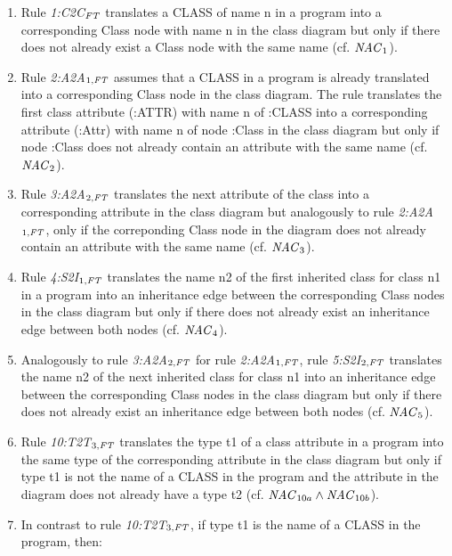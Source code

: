 \begin{example}
\begin{enumerate}
  \item Rule \textit{1:C2C}$_\mathit{FT}$ translates a \textsf{CLASS} of name \textsf{n} in a program into a corresponding \textsf{Class} node with name \textsf{n} in the class diagram but only if there does not already exist a \textsf{Class} node with the same name (cf. $\mathit{NAC}_1$).
  \item Rule \textit{2:A2A}$_{1,\mathit{FT}}$ assumes that a \textsf{CLASS} in a program is already translated into a corresponding \textsf{Class} node in the class diagram.
  The rule translates the first class attribute (\textsf{:ATTR}) with name \textsf{n} of \textsf{:CLASS} into a corresponding attribute (\textsf{:Attr}) with name \textsf{n} of node \textsf{:Class} in the class diagram but only if node \textsf{:Class} does not already contain an attribute with the same name (cf. $\mathit{NAC}_2$).
  \item Rule \textit{3:A2A}$_{2,\mathit{FT}}$ translates the next attribute of the class into a corresponding attribute in the class diagram but analogously to rule \textit{2:A2A}$_{1,\mathit{FT}}$, only if the correponding \textsf{Class} node in the diagram does not already contain an attribute with the same name (cf. $\mathit{NAC}_3$).
  \item Rule \textit{4:S2I}$_{1,\mathit{FT}}$ translates the name \textsf{n2} of the first inherited class for class \textsf{n1} in a program into an inheritance edge between the corresponding \textsf{Class} nodes in the class diagram but only if there does not already exist an inheritance edge between both nodes (cf. $\mathit{NAC}_4$).
  \item Analogously to rule \textit{3:A2A}$_{2,\mathit{FT}}$ for rule \textit{2:A2A}$_{1,\mathit{FT}}$, rule \textit{5:S2I}$_{2,\mathit{FT}}$ translates the name \textsf{n2} of the next inherited class for class \textsf{n1} into an inheritance edge between the corresponding \textsf{Class} nodes in the class diagram but only if there does not already exist an inheritance edge between both nodes (cf. $\mathit{NAC}_5$).
  \item Rule \textit{10:T2T}$_{3,\mathit{FT}}$ translates the type \textsf{t1} of a class attribute in a program into the same type of the corresponding attribute in the class diagram but only if type \textsf{t1} is not the name of a \textsf{CLASS} in the program and the attribute in the diagram does not already have a type \textsf{t2} (cf. $\mathit{NAC}_{10a} \wedge \mathit{NAC}_{10b}$).
  \item In contrast to rule \textit{10:T2T}$_{3,\mathit{FT}}$, if type \textsf{t1} is the name of a \textsf{CLASS} in the program, then:

\end{enumerate}
\end{example}
